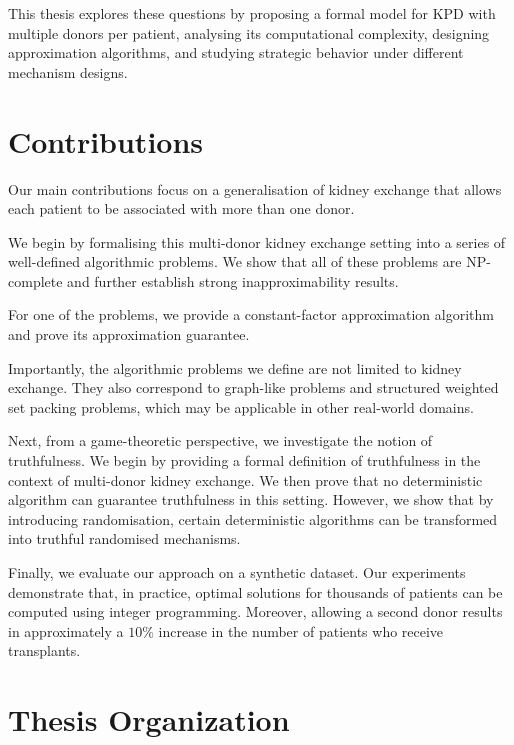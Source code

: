 
This thesis explores these questions by proposing a formal model for KPD with multiple donors per patient, analysing its computational complexity, designing approximation algorithms, and studying strategic behavior under different mechanism designs.

\section{Contributions}

Our main contributions focus on a generalisation of kidney exchange that allows each patient to be associated with more than one donor.

We begin by formalising this multi-donor kidney exchange setting into a series of well-defined algorithmic problems. We show that all of these problems are NP-complete and further establish strong inapproximability results.

For one of the problems, we provide a constant-factor approximation algorithm and prove its approximation guarantee.

Importantly, the algorithmic problems we define are not limited to kidney exchange. They also correspond to graph-like problems and structured weighted set packing problems, which may be applicable in other real-world domains.

Next, from a game-theoretic perspective, we investigate the notion of truthfulness. We begin by providing a formal definition of truthfulness in the context of multi-donor kidney exchange. We then prove that no deterministic algorithm can guarantee truthfulness in this setting. However, we show that by introducing randomisation, certain deterministic algorithms can be transformed into truthful randomised mechanisms.

Finally, we evaluate our approach on a synthetic dataset. Our experiments demonstrate that, in practice, optimal solutions for thousands of patients can be computed using integer programming. Moreover, allowing a second donor results in approximately a $10\%$ increase in the number of patients who receive transplants.


\section{Thesis Organization}



